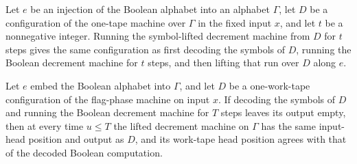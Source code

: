 \begin{theorem}
\label{Turing.sc_lift_run}
\leanok
{}
Let $e$ be an injection of the Boolean alphabet into an alphabet $\Gamma$, let $D$ be a
configuration of the one-tape machine over $\Gamma$ in the fixed input $x$, and let $t$
be a nonnegative integer. Running the symbol-lifted decrement machine from $D$ for $t$
steps gives the same configuration as first decoding the symbols of $D$, running the
Boolean decrement machine for $t$ steps, and then lifting that run over $D$ along $e$.
\end{theorem}

\begin{theorem}
\label{Turing.sc_lift_frame}
\leanok
{}
Let $e$ embed the Boolean alphabet into $\Gamma$, and let $D$ be a one-work-tape
configuration of the flag-phase machine on input $x$. If decoding the symbols of $D$ and
running the Boolean decrement machine for $T$ steps leaves its output empty, then at
every time $u\le T$ the lifted decrement machine on $\Gamma$ has the same input-head
position and output as $D$, and its work-tape head position agrees with that of the
decoded Boolean computation.
\end{theorem}

